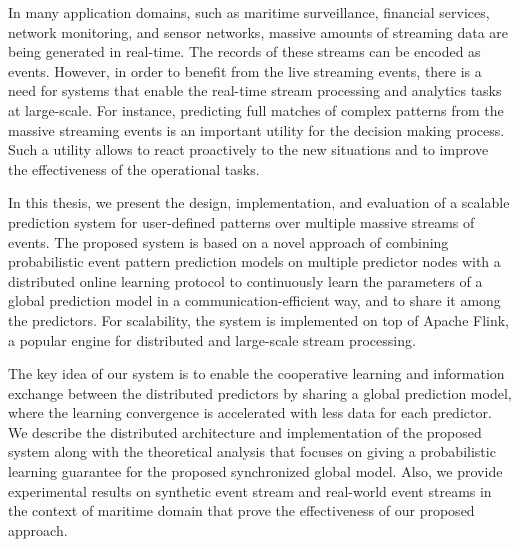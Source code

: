
\par In many application domains, such as maritime surveillance, financial services, network monitoring, and sensor networks, massive amounts of streaming data are being generated in real-time. The records of these streams can be encoded as events.  However, in order to benefit from the live streaming events, there is a need for systems that enable the real-time stream processing and analytics tasks at large-scale. For instance, predicting full matches of complex patterns from the massive streaming events is an important utility for the decision making process. Such a utility allows to react proactively to the new situations and to improve the effectiveness of the operational tasks.

\par In this thesis, we present the design, implementation, and evaluation of a scalable prediction system for user-defined patterns over multiple massive streams of events. The proposed system is based on a novel approach of combining probabilistic event pattern prediction models on multiple predictor nodes with a distributed online learning protocol to continuously learn the parameters of a global prediction model in a communication-efficient way, and to share it among the predictors. For  scalability, the system is implemented on top of Apache Flink, a popular engine for distributed and large-scale stream processing.



\par  The key idea of our system is to enable the cooperative learning and information exchange between the distributed predictors by sharing a global prediction model, where the learning convergence is accelerated with less data for each predictor. We describe the distributed architecture and implementation of the proposed system along with the theoretical analysis that focuses on giving a probabilistic learning guarantee for the proposed synchronized global model. Also, we provide experimental results on synthetic event stream and real-world event streams in the context of maritime domain that prove the effectiveness of our proposed approach.



